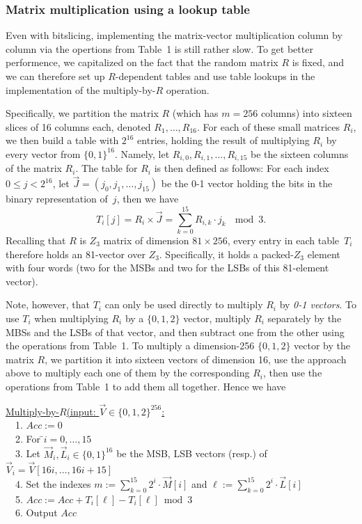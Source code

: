 
\subsubsection{Matrix multiplication using a lookup table}

Even with bitslicing, implementing the matrix-vector multiplication column by column via the opertions from Table~1 is still rather slow.
To get better performence, we capitalized on the fact that the random matrix $R$ is fixed, and we can therefore set up $R$-dependent tables and use table lookups in the implementation of the multiply-by-$R$ operation.

Specifically, we partition the matrix $R$ (which has $m=256$ columns) into sixteen slices of 16 columns each, denoted $R_1,\ldots,R_{16}$.
For each of these small matrices $R_i$, we then build a table with $2^{16}$ entries, holding the result of multiplying $R_i$ by every vector from $\{0,1\}^{16}$.
Namely, let $R_{i,0},R_{i,1},\ldots,R_{i,15}$ be the sixteen columns of the matrix $R_i$.
The table for $R_i$ is then defined as follows: For each index $0\le j < 2^{16}$, let $\vec{J}=(j_0,j_1,\ldots,j_{15})$ be the 0-1 vector holding the bits in the binary representation of~$j$, then we have
\[
T_i[j] = R_i \times \vec{J} = \sum_{k=0}^{15} R_{i,k} \cdot j_k ~~\bmod 3.
\]
Recalling that $R$ is $Z_3$ matrix of dimension $81\times 256$, every entry in each table~$T_i$ therefore holds an 81-vector over $Z_3$.
Specifically, it holds a packed-$Z_3$ element with four words (two for the MSBs and two for the LSBs of this 81-element vector).

Note, however, that $T_i$ can only be used directly to multiply $R_i$ by \emph{0-1 vectors}.
To use $T_i$ when multiplying $R_i$ by a $\{0,1,2\}$ vector, multiply $R_i$ separately by the MBSs and the LSBs of that vector, and then subtract one from the other using the operations from Table~1.
To multiply a dimension-256 $\{0,1,2\}$ vector by the matrix $R$, we partition it into sixteen vectors of dimension 16, use the approach above to multiply each one of them by the corresponding $R_i$, then use the operations from Table~1 to add them all together.
Hence we have

\begin{tabbing}
	\underline{Multiply-by-$R$(input: $\vec{V}\in\{0,1,2\}^{256}$:}\\
	~~1. $Acc := 0$\\
	~~2. For \=$i=0,\ldots,15$\\
	~~3. \> Let $\vec{M}_i,\vec{L}_i\in\{0,1\}^{16}$ be the MSB, LSB vectors (resp.) of $\vec{V}_i=\vec{V}[16i,\ldots,16i+15]$\\
	~~4. \> Set the indexes $m:=\sum_{k=0}^{15}2^i\cdot\vec{M}[i]$
	and $\ell:=\sum_{k=0}^{15}2^i\cdot\vec{L}[i]$\\
	~~5. \> $Acc := Acc + T_i[\ell] - T_i[\ell] \bmod 3$\\
	~~6. Output $Acc$
\end{tabbing}

